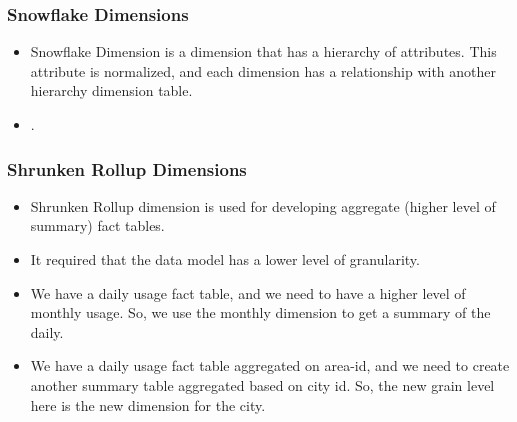 \begin{frame}
    \frametitle{Snowflake Dimensions}
    \begin{itemize}
        \item Snowflake Dimension is a dimension that has a hierarchy of attributes. This attribute is normalized, and each dimension has a relationship with another hierarchy dimension table.\\
		\item {}.
    \end{itemize}
    \centering
    
\end{frame}
\begin{frame}
    \frametitle{Shrunken Rollup Dimensions}%
    \begin{itemize}[<+->]    	
		\item Shrunken Rollup dimension is used for developing aggregate (higher level of summary) fact tables. 
		\item It required that the data model has a lower level of granularity.
	\end{itemize}
		\begin{example}
		    \begin{itemize}[<+->]    	
			\item We have a daily usage fact table, and we need to have a higher level of monthly usage. So, we use the monthly dimension to get a summary of the daily.
			\item We have a daily usage fact table aggregated on area-id, and we need to create another summary table aggregated based on city id. So, the new grain level here is the new dimension for the city.
			\end{itemize}
		\end{example}
\end{frame}
